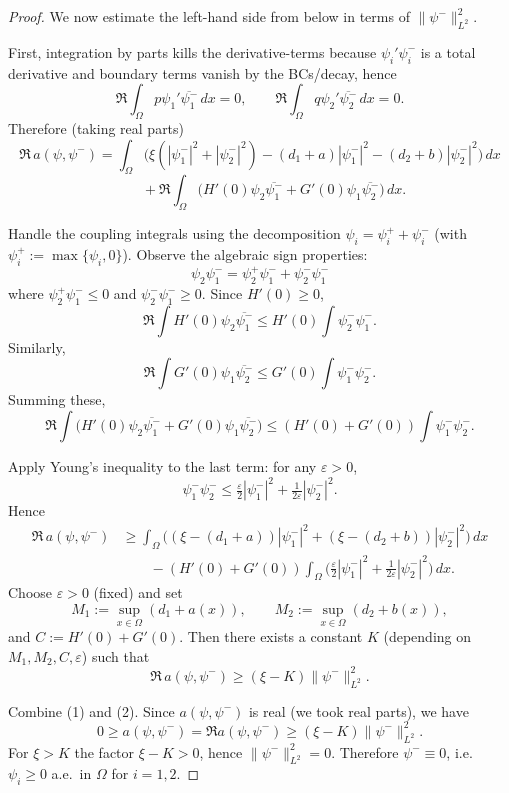\documentclass[a4paper,11pt]{amsart}
\theoremstyle{definition}
\numberwithin{equation}{section}
\theoremstyle{definition}
\begin{document}
\begin{proof}
We now estimate the left-hand side from below in terms of $\|\psi^-\|_{L^2}^2$.

First, integration by parts kills the derivative-terms because $\psi_i'\psi_i^-$ is a total derivative and boundary terms vanish by the BCs/decay, hence
\[
\Re\int_\Omega p\psi_1'\overline{\psi_1^-}\,dx = 0,\qquad
\Re\int_\Omega q\psi_2'\overline{\psi_2^-}\,dx = 0.
\]
Therefore (taking real parts)
\[
\Re\,a(\psi,\psi^-)
= \int_\Omega \Big( \xi(|\psi_1^-|^2+|\psi_2^-|^2) - (d_1+a)|\psi_1^-|^2 - (d_2+b)|\psi_2^-|^2 \Big)\,dx
\]
\[
\qquad + \Re\int_\Omega\Big( H'(0)\psi_2\overline{\psi_1^-} + G'(0)\psi_1\overline{\psi_2^-}\Big)\,dx.
\]

Handle the coupling integrals using the decomposition $\psi_i=\psi_i^+ + \psi_i^-$ (with $\psi_i^+:=\max\{\psi_i,0\}$). Observe the algebraic sign properties:
\[
\psi_2\psi_1^- = \psi_2^+\psi_1^- + \psi_2^-\psi_1^-
\]
where $\psi_2^+\psi_1^-\le 0$ and $\psi_2^-\psi_1^-\geq0$. Since $H'(0)\geq0$,
\[
\Re\int H'(0)\psi_2\overline{\psi_1^-}
\le H'(0)\int \psi_2^-\psi_1^-.
\]
Similarly,
\[
\Re\int G'(0)\psi_1\overline{\psi_2^-}
\le G'(0)\int \psi_1^-\psi_2^-.
\]
Summing these,
\[
\Re\int\Big( H'(0)\psi_2\overline{\psi_1^-} + G'(0)\psi_1\overline{\psi_2^-}\Big)
\le (H'(0)+G'(0))\int \psi_1^-\psi_2^-.
\]

Apply Young's inequality to the last term: for any $\varepsilon>0$,
\[
\psi_1^-\psi_2^- \leq \tfrac{\varepsilon}{2}|\psi_1^-|^2 + \tfrac{1}{2\varepsilon}|\psi_2^-|^2.
\]
Hence
\[
\begin{aligned}
\Re\,a(\psi,\psi^-)
&\ge \int_\Omega \Big( (\xi - (d_1+a))|\psi_1^-|^2 + (\xi - (d_2+b))|\psi_2^-|^2 \Big)\,dx \\
&\qquad - (H'(0)+G'(0))\int_\Omega\Big( \tfrac{\varepsilon}{2}|\psi_1^-|^2 + \tfrac{1}{2\varepsilon}|\psi_2^-|^2\Big)\,dx.
\end{aligned}
\]
Choose $\varepsilon>0$ (fixed) and set
\[
M_1:=\sup_{x\in\Omega}(d_1+a(x)),\qquad M_2:=\sup_{x\in\Omega}(d_2+b(x)),
\]
and \(C:=H'(0)+G'(0)\). Then there exists a constant \(K\) (depending on \(M_1,M_2,C,\varepsilon\)) such that
\[
\Re\,a(\psi,\psi^-)\geq (\xi-K)\|\psi^-\|_{L^2}^2. \tag{2}
\]

Combine (1) and (2). Since $a(\psi,\psi^-)$ is real (we took real parts), we have
\[
0 \geq a(\psi,\psi^-) = \Re a(\psi,\psi^-) \geq (\xi-K)\|\psi^-\|_{L^2}^2.
\]
For $\xi>K$ the factor \(\xi-K>0\), hence \(\|\psi^-\|_{L^2}^2=0\). Therefore \(\psi^- \equiv 0\), i.e. \(\psi_i\geq0\) a.e.\ in \(\Omega\) for \(i=1,2\).


\end{proof}
\end{document}
